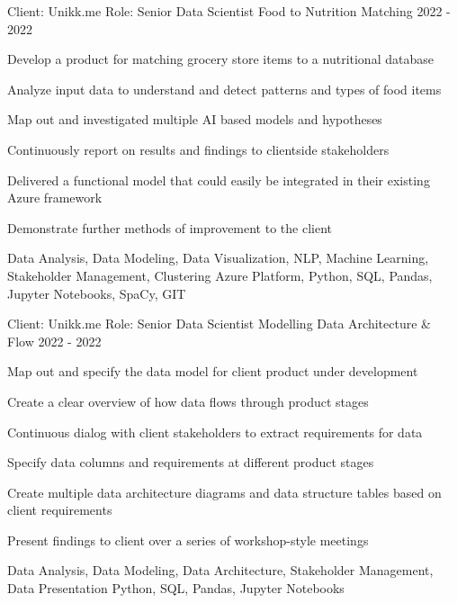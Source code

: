 \begin{cventries}
\cventry
{Client: Unikk.me \newline Role: Senior Data Scientist} %
{Food to Nutrition Matching} %
{}%
{2022 - 2022} %
{ %
\begin{cvitems}
\item {Develop a product for matching grocery store items to a nutritional database}
\item {Analyze input data to understand and detect patterns and types of food items}
\item {Map out and investigated multiple AI based models and hypotheses}
\item {Continuously report on results and findings to clientside stakeholders}
\item {Delivered a functional model that could easily be integrated in their existing Azure framework}
\item {Demonstrate further methods of improvement to the client}
\end{cvitems}
\cventrykeywords
{Data Analysis, Data Modeling, Data Visualization, NLP, Machine Learning, Stakeholder Management, Clustering}
{Azure Platform, Python, SQL, Pandas, Jupyter Notebooks, SpaCy, GIT}
}

\cventry
{Client: Unikk.me \newline Role: Senior Data Scientist} %
{Modelling Data Architecture \& Flow} %
{}%
{2022 - 2022} %
{ %
\begin{cvitems}
\item {Map out and specify the data model for client product under development}
\item {Create a clear overview of how data flows through product stages}
\item {Continuous dialog with client stakeholders to extract requirements for data}
\item {Specify data columns and requirements at different product stages}
\item {Create multiple data architecture diagrams and data structure tables based on client requirements}
\item {Present findings to client over a series of workshop-style meetings}
\end{cvitems}
\cventrykeywords
{Data Analysis, Data Modeling, Data Architecture, Stakeholder Management, Data Presentation}
{Python, SQL, Pandas, Jupyter Notebooks}
}


\end{cventries}
